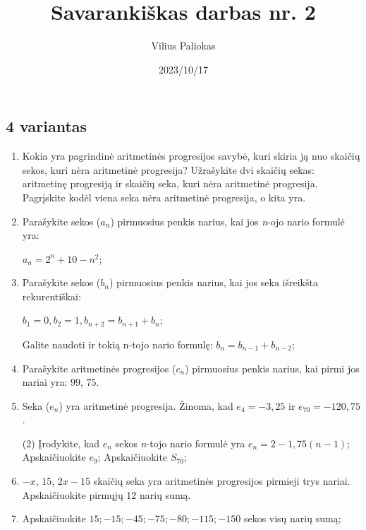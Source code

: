 \documentclass[a4paper]{article}
\title{Savarankiškas darbas nr. 2}
\author{Vilius Paliokas}
\date{2023/10/17}
\begin{document}
\thispagestyle{fancy}

\subsection*{4 variantas}

\begin{enumerate}
      \item Kokia yra pagrindinė aritmetinės progresijos savybė, kuri skiria ją
            nuo skaičių sekos, kuri nėra aritmetinė progresija? Užrašykite dvi
            skaičių sekas: aritmetinę progresiją ir skaičių seka, kuri nėra
            aritmetinė progresija. Pagrįskite kodėl viena seka nėra
            aritmetinė progresija, o kita yra.

      \item Parašykite sekos ($a_{n}$) pirmuosius penkis
            narius, kai jos \textit{n}-ojo nario formulė yra:

            $a_{n}=2^n+10-n^2$;

      \item Parašykite sekos ($b_{n}$) pirmuosius penkis
            narius, kai jos seka išreikšta rekurentiškai:

            $b_1 = 0, b_2 = 1, b_{n+2}=b_{n+1}+b_{n}$;

            Galite naudoti ir tokią n-tojo nario formulę: 
            $b_{n}=b_{n-1}+b_{n-2}$;

      \item Parašykite aritmetinės progresijos ($c_{n}$) pirmuosius penkis
            narius, kai pirmi jos nariai yra: $99$, $75$.

      \item Seka ($e_{n}$) yra aritmetinė progresija. Žinoma, kad $e_{4}=-3,25$ ir
            $e_{70}=-120,75$.

            \begin{tasks}[item-format={\normalfont}, after-item-skip=2mm](2)
                  \task* Įrodykite, kad $e_{n}$ sekos \textit{n}-tojo nario
                  formulė yra $e_{n}=2-1,75(n-1)$;
                  \task Apskaičiuokite $e_{9}$;
                  \task Apskaičiuokite $S_{70}$;
            \end{tasks}

      \item $ -x $, $ 15 $, $ 2x - 15$ skaičių seka yra aritmetinės progresijos
            pirmieji trys nariai. Apskaičiuokite pirmųjų 12 narių sumą.

      \item Apskaičiuokite $ 15;-15;-45;-75;-80;-115;-150$ sekos visų narių sumą;


\end{enumerate}
\end{document}

